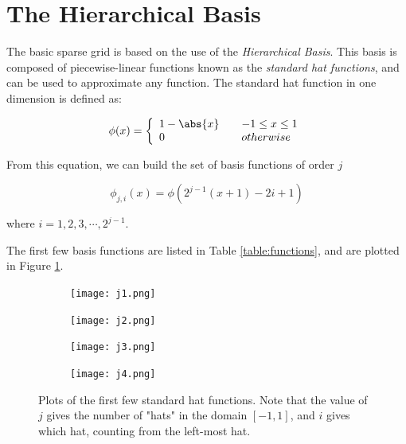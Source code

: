 \section*{The Hierarchical Basis}
The basic sparse grid is based on the use of the \emph{Hierarchical Basis}.  This basis is composed of piecewise-linear functions known as the \emph{standard hat functions}, and can be used to approximate any function.  The standard hat function in one dimension is defined as:

\begin{equation}
\phi(x) = \left\{
        \begin{array}{ll}
            1-\abs{x} & \quad -1 \leq x \leq 1 \\
            0 & \quad otherwise
        \end{array}
    \right.
\end{equation}

From this equation, we can build the set of basis functions of order $j$

\begin{equation}
\phi_{j,i}(x) = \phi(2^{j-1}(x+1) - 2i+1)
\end{equation}

\begin{center}
where $i=1,2,3,\cdots,2^{j-1}$.
\end{center}

The first few basis functions are listed in Table \ref{table:functions}, and are plotted in Figure \ref{fig:basis_functions}.

\begin{center}
\begin{figure}
\begin{subfigure}{.49\textwidth}
\texttt{[image: j1.png]}
\end{subfigure}
\begin{subfigure}{.49\textwidth}
\texttt{[image: j2.png]}
\end{subfigure}
\begin{subfigure}{.49\textwidth}
\texttt{[image: j3.png]}
\end{subfigure}
\begin{subfigure}{.49\textwidth}
\texttt{[image: j4.png]}
\end{subfigure}
\caption{Plots of the first few standard hat functions.  Note that the value of $j$ gives the number of "hats" in the domain $[-1,1]$, and $i$ gives which hat, counting from the left-most hat.}
\label{fig:basis_functions}
\end{figure}
\end{center}

